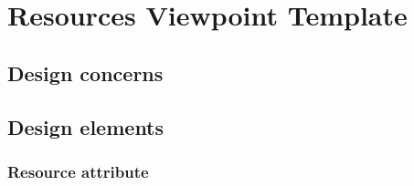 \chapter{Resources Viewpoint Template} \label{chp:resources-viewpoint-template}
	\begin{comment}
		The purpose of the Resource viewpoint is to model the characteristics and utilization of resources in a
		design subject.
	\end{comment}
	
	\section{Design concerns} \label{s:resources-viewpoint-template:design-concerns}
		\begin{comment}
			Key concerns include resource utilization, resource contention, availability, and performance.
		\end{comment}
	
	\section{Design elements} \label{s:resources-viewpoint-template:design-elements}
		\begin{comment}
			Design entities: resources, usage policies.
			
			Design relationships: allocation and uses.
			
			Design attributes: identification (4.6.2.1), resource (5.13.2.1), performance measures (such as throughput,
			rate of consumption).
			
			Design constraints: priorities, locks, resource constraints.
		\end{comment}
		
		\subsection{Resource attribute} \label{s:resources-viewpoint-template:resource-attribute}
			\begin{comment}
				A description of the elements used by the entity that are external to the design. The resources attribute
				identifies and describes all of the resources external to the design that are needed by this entity to perform
				its function. The interaction rules and methods for using the resource are to be specified by this attribute.
			
				This attribute provides information about items such as physical devices (printers, disc-partitions, memory
				banks), software services (math libraries, operating system services), and processing resources (CPU
				cycles, memory allocation, buffers).
				
				The resources attribute should describe usage characteristics such as the processing time at which resources
				are to be acquired and sizing to include quantity, and physical sizes of buffer usage. It should also include
				the identification of potential race and deadlock conditions as well as resource management facilities.

				NOTE—This design attribute is retained for compatibility with IEEE Std 1016-1998.
			\end{comment}
			
